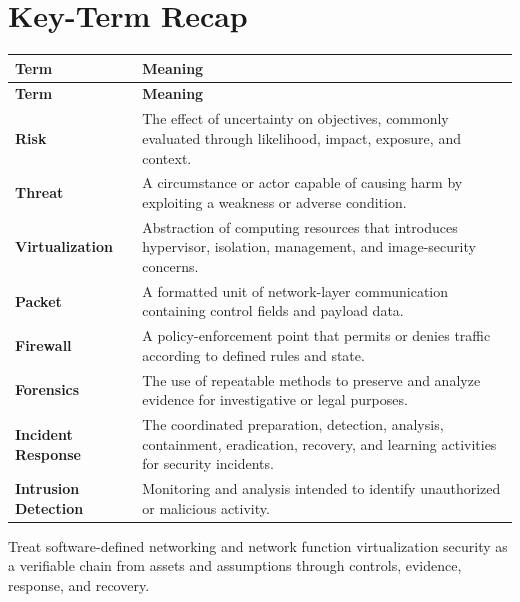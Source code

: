 \documentclass[11pt]{article}
\begin{document}
\section*{Key-Term Recap}
\begin{longtable}{>{\RaggedRight\arraybackslash}p{}>{\RaggedRight\arraybackslash}p{}}
\toprule\rowcolor{Navy}\color{white}\textbf{Term} & \color{white}\textbf{Meaning}\\\midrule
\endfirsthead
\toprule\rowcolor{Navy}\color{white}\textbf{Term} & \color{white}\textbf{Meaning}\\\midrule
\endhead
\textbf{Risk} & The effect of uncertainty on objectives, commonly evaluated through likelihood, impact, exposure, and context. \\\midrule
\textbf{Threat} & A circumstance or actor capable of causing harm by exploiting a weakness or adverse condition. \\\midrule
\textbf{Virtualization} & Abstraction of computing resources that introduces hypervisor, isolation, management, and image-security concerns. \\\midrule
\textbf{Packet} & A formatted unit of network-layer communication containing control fields and payload data. \\\midrule
\textbf{Firewall} & A policy-enforcement point that permits or denies traffic according to defined rules and state. \\\midrule
\textbf{Forensics} & The use of repeatable methods to preserve and analyze evidence for investigative or legal purposes. \\\midrule
\textbf{Incident Response} & The coordinated preparation, detection, analysis, containment, eradication, recovery, and learning activities for security incidents. \\\midrule
\textbf{Intrusion Detection} & Monitoring and analysis intended to identify unauthorized or malicious activity. \\\midrule
\bottomrule
\end{longtable}
\begin{takeawaybox}
Treat software-defined networking and network function virtualization security as a verifiable chain from assets and assumptions through controls, evidence, response, and recovery.
\end{takeawaybox}
\end{document}
